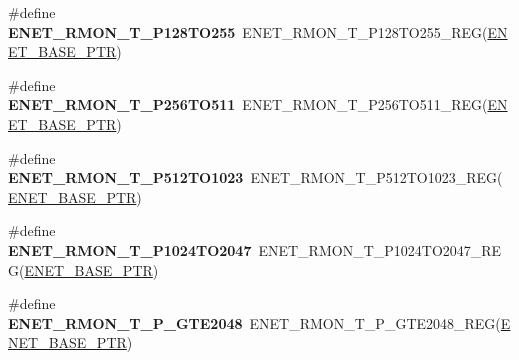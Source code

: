\begin{DoxyCompactItemize}
\item 
\hypertarget{group___e_n_e_t___register___accessor___macros_ga46ecd6f991a973fb35eafaa7520edfa4}{}\#define {\bfseries E\+N\+E\+T\+\_\+\+R\+M\+O\+N\+\_\+\+T\+\_\+\+P128\+T\+O255}~E\+N\+E\+T\+\_\+\+R\+M\+O\+N\+\_\+\+T\+\_\+\+P128\+T\+O255\+\_\+\+R\+E\+G(\hyperlink{group___e_n_e_t___peripheral_gab64a2d991cc2bd76dd55ee25a52dcb5c}{E\+N\+E\+T\+\_\+\+B\+A\+S\+E\+\_\+\+P\+T\+R})\label{group___e_n_e_t___register___accessor___macros_ga46ecd6f991a973fb35eafaa7520edfa4}

\item 
\hypertarget{group___e_n_e_t___register___accessor___macros_ga6b5b079c08add074de625720273e711f}{}\#define {\bfseries E\+N\+E\+T\+\_\+\+R\+M\+O\+N\+\_\+\+T\+\_\+\+P256\+T\+O511}~E\+N\+E\+T\+\_\+\+R\+M\+O\+N\+\_\+\+T\+\_\+\+P256\+T\+O511\+\_\+\+R\+E\+G(\hyperlink{group___e_n_e_t___peripheral_gab64a2d991cc2bd76dd55ee25a52dcb5c}{E\+N\+E\+T\+\_\+\+B\+A\+S\+E\+\_\+\+P\+T\+R})\label{group___e_n_e_t___register___accessor___macros_ga6b5b079c08add074de625720273e711f}

\item 
\hypertarget{group___e_n_e_t___register___accessor___macros_ga9681a2de24b0515397a85b0c69d4e8df}{}\#define {\bfseries E\+N\+E\+T\+\_\+\+R\+M\+O\+N\+\_\+\+T\+\_\+\+P512\+T\+O1023}~E\+N\+E\+T\+\_\+\+R\+M\+O\+N\+\_\+\+T\+\_\+\+P512\+T\+O1023\+\_\+\+R\+E\+G(\hyperlink{group___e_n_e_t___peripheral_gab64a2d991cc2bd76dd55ee25a52dcb5c}{E\+N\+E\+T\+\_\+\+B\+A\+S\+E\+\_\+\+P\+T\+R})\label{group___e_n_e_t___register___accessor___macros_ga9681a2de24b0515397a85b0c69d4e8df}

\item 
\hypertarget{group___e_n_e_t___register___accessor___macros_ga64849c42635761d448ba9b92129ddf3c}{}\#define {\bfseries E\+N\+E\+T\+\_\+\+R\+M\+O\+N\+\_\+\+T\+\_\+\+P1024\+T\+O2047}~E\+N\+E\+T\+\_\+\+R\+M\+O\+N\+\_\+\+T\+\_\+\+P1024\+T\+O2047\+\_\+\+R\+E\+G(\hyperlink{group___e_n_e_t___peripheral_gab64a2d991cc2bd76dd55ee25a52dcb5c}{E\+N\+E\+T\+\_\+\+B\+A\+S\+E\+\_\+\+P\+T\+R})\label{group___e_n_e_t___register___accessor___macros_ga64849c42635761d448ba9b92129ddf3c}

\item 
\hypertarget{group___e_n_e_t___register___accessor___macros_ga6437d0d25e4b3d0f218a27a6f1558eb1}{}\#define {\bfseries E\+N\+E\+T\+\_\+\+R\+M\+O\+N\+\_\+\+T\+\_\+\+P\+\_\+\+G\+T\+E2048}~E\+N\+E\+T\+\_\+\+R\+M\+O\+N\+\_\+\+T\+\_\+\+P\+\_\+\+G\+T\+E2048\+\_\+\+R\+E\+G(\hyperlink{group___e_n_e_t___peripheral_gab64a2d991cc2bd76dd55ee25a52dcb5c}{E\+N\+E\+T\+\_\+\+B\+A\+S\+E\+\_\+\+P\+T\+R})\label{group___e_n_e_t___register___accessor___macros_ga6437d0d25e4b3d0f218a27a6f1558eb1}


\end{DoxyCompactItemize}
